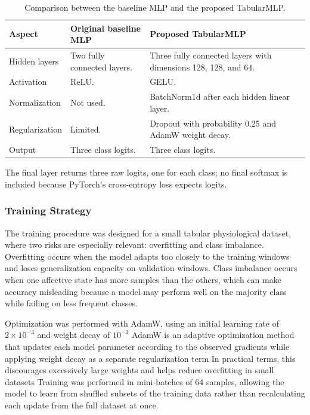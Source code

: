 \documentclass[12pt]{article}
\begin{document}
\begingroup
\footnotesize \setlength{\tabcolsep}{3pt} \renewcommand{\arraystretch}{0.96} \setlength{\LTpre}{2pt} \setlength{\LTpost}{2pt}
\begin{longtable}{p{2.6cm} p{4.4cm} p{5.2cm}}
\caption{Comparison between the baseline MLP and the proposed TabularMLP.}
\label{tab:model_architecture_comparison}\\[-0.2em]
\toprule
\textbf{Aspect} & \textbf{Original baseline MLP} & \textbf{Proposed TabularMLP} \\ \midrule
Hidden layers & Two fully connected layers. & Three fully connected layers with dimensions 128, 128, and 64. \\ \midrule
Activation & ReLU. & GELU. \\ \midrule
Normalization & Not used. & BatchNorm1d after each hidden linear layer. \\ \midrule
Regularization & Limited. & Dropout with probability 0.25 and AdamW weight decay. \\ \midrule
Output & Three class logits. & Three class logits. \\ \bottomrule
\end{longtable}
\endgroup

The final layer returns three raw logits, one for each class; no final softmax is included because PyTorch's cross-entropy loss expects logits.

\subsubsection{Training Strategy}

The training procedure was designed for a small tabular physiological dataset, where two risks are especially relevant: overfitting and class imbalance. Overfitting occurs when the model adapts too closely to the training windows and loses generalization capacity on validation windows. Class imbalance occurs when one affective state has more samples than the others, which can make accuracy misleading because a model may perform well on the majority class while failing on less frequent classes.

Optimization was performed with AdamW, using an initial learning rate of $2 \times 10^{-3}$ and weight decay of $10^{-3}$ AdamW is an adaptive optimization method that updates each model parameter according to the observed gradients while applying weight decay as a separate regularization term In practical terms, this discourages excessively large weights and helps reduce overfitting in small datasets Training was performed in mini-batches of 64 samples, allowing the model to learn from shuffled subsets of the training data rather than recalculating each update from the full dataset at once.
\end{document}
